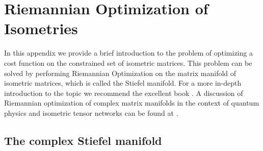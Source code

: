 \documentclass[encoding=utf8,british]{template/thesis}
\begin{document}
	\appendix
	
	\chapter{Riemannian Optimization of Isometries}
	
	In this appendix we provide a brief introduction to the problem of optimizing a cost function on the constrained set of isometric matrices. This problem can be solved by performing Riemannian Optimization on the matrix manifold of isometric matrices, which is called the Stiefel manifold. For a more in-depth introduction to the topic we recommend the excellent book \cite{cite:optimization_on_matrix_manifolds}. A discussion of Riemannian optimization of complex matrix manifolds in the context of quantum physics and isometric tensor networks can be found at \cite{cite:riemannian_geometry_automatic_differentiation_quantum_physics, cite:riemannian_optimization_isometric_tensor_networks}.
	
	\section{The complex Stiefel manifold}
	
\end{document}
